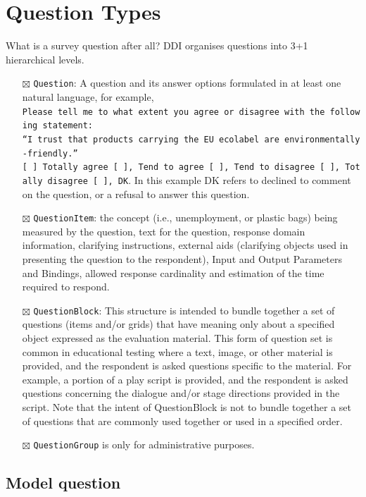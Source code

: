 \documentclass[
  letterpaper,
  DIV=11,
  numbers=noendperiod]{scrreprt}
\begin{document}
\section{Question Types}\label{question-types}

What is a survey question after all? DDI organises questions into 3+1
hierarchical levels.

\begin{itemize}
\item[$\boxtimes$]
  \texttt{Question}: A question and its answer options formulated in at
  least one natural language, for example,
  \texttt{Please\ tell\ me\ to\ what\ extent\ you\ agree\ or\ disagree\ with\ the\ following\ statement:}
  \texttt{“I\ trust\ that\ products\ carrying\ the\ EU\ ecolabel\ are\ environmentally-friendly.”}
  \texttt{{[}\ {]}\ Totally\ agree\ {[}\ {]},\ Tend\ to\ agree\ {[}\ {]},\ Tend\ to\ disagree\ {[}\ {]},\ Totally\ disagree\ {[}\ {]},\ DK}.
  In this example DK refers to declined to comment on the question, or a
  refusal to answer this question.
\item[$\boxtimes$]
  \texttt{QuestionItem}: the concept (i.e., unemployment, or plastic
  bags) being measured by the question, text for the question, response
  domain information, clarifying instructions, external aids (clarifying
  objects used in presenting the question to the respondent), Input and
  Output Parameters and Bindings, allowed response cardinality and
  estimation of the time required to respond.
\item[$\boxtimes$]
  \texttt{QuestionBlock}: This structure is intended to bundle together
  a set of questions (items and/or grids) that have meaning only about a
  specified object expressed as the evaluation material. This form of
  question set is common in educational testing where a text, image, or
  other material is provided, and the respondent is asked questions
  specific to the material. For example, a portion of a play script is
  provided, and the respondent is asked questions concerning the
  dialogue and/or stage directions provided in the script. Note that the
  intent of QuestionBlock is not to bundle together a set of questions
  that are commonly used together or used in a specified order.
\item[$\boxtimes$]
  \texttt{QuestionGroup} is only for administrative purposes.
\end{itemize}

\subsection{Model question}\label{model-question}
\end{document}
